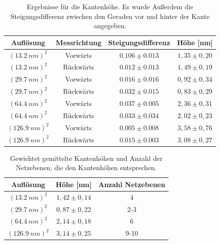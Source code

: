 \documentclass[12pt,a4paper]{article}
\begin{document}
\begin{table}
\centering
\begin{tabular}{|c|c|c|c|}
\hline 
Auflösung & Messrichtung & Steigungsdifferenz & Höhe [nm]\\ 
\hline 
$(\SI{13,2}{nm})^2$ & Vorwärts & $0.106\pm0.013$ & $1,35 \pm 0,20$\\
\hline 
$(\SI{13,2}{nm})^2$ & Rückwärts & $0.012\pm0.013$ & $1,49 \pm 0,19$\\
\hline 
$(\SI{29,7}{nm})^2$ & Vorwärts & $0.016\pm0.016$ & $0,92 \pm 0,34$\\
\hline 
$(\SI{29,7}{nm})^2$ & Rückwärts & $0.032\pm0.015$ & $0,83 \pm 0,29$\\
\hline 
$(\SI{64,4}{nm})^2$ & Vorwärts & $0.037\pm0.005$ & $2,36 \pm 0,31$\\
\hline 
$(\SI{64,4}{nm})^2$ & Rückwärts & $0.033\pm0.034$ & $2,02\pm 0,23$\\
\hline 
$(\SI{126,9}{nm})^2$ & Vorwärts & $0.005\pm0.008$ & $3,58 \pm 0,76$\\
\hline 
$(\SI{126,9}{nm})^2$ & Rückwärts & $0.015\pm0.003$ & $3,08 \pm 0,27$\\
\hline
\end{tabular} 
\caption{Ergebnisse für die Kantenhöhe. Es wurde Außerdem die Steigungsdifferenz zwischen den Geraden vor und hinter der Kante angegeben.}
\label{tab:Kantenhöhe_Ergebnisse}
\end{table}

\begin{table}
\centering
\begin{tabular}{|c|c|c|}
\hline 
Auflösung & Höhe [nm] & Anzahl Netzebenen\\ 
\hline 
$(\SI{13,2}{nm})^2$ & $1,42 \pm 0,14$ & 4 \\
\hline 
$(\SI{29,7}{nm})^2$ & $0,87 \pm 0,22$ & 2-3 \\
\hline 
$(\SI{64,4}{nm})^2$ & $2,14 \pm 0,18$ & 6 \\
\hline 
$(\SI{126,9}{nm})^2$ & $3,14 \pm 0,25$ & 9-10 \\
\hline
\end{tabular} 
\caption{Gewichtet gemittelte Kantenhöhen und Anzahl der Netzebenen, die den Kantenhöhen entsprechen.}
\label{tab:Kantenhöhe_EndErgebnisse}
\end{table}
\end{document}
